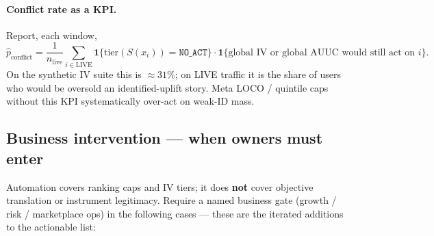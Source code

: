 \documentclass{article}
\begin{document}
\paragraph{Conflict rate as a KPI.}
Report, each window,
\[
  \widehat{p}_{\mathrm{conflict}}
  =
  \frac{1}{n_{\mathrm{live}}}
  \sum_{i\in\mathrm{LIVE}}
  \mathbf{1}\{\mathrm{tier}(S(x_i))=\texttt{NO\_ACT}\}
  \cdot
  \mathbf{1}\{\text{global IV or global AUUC would still act on }i\}.
\]
On the synthetic IV suite this is $\approx 31\%$; on LIVE traffic it is the
share of users who would be oversold an identified-uplift story.
Meta LOCO / quintile caps without this KPI systematically over-act on
weak-ID mass.

\subsection{Business intervention --- when owners must enter}
\label{sec:business-gate}

Automation covers ranking caps and IV tiers; it does \textbf{not} cover
objective translation or instrument legitimacy.
Require a named business gate (growth / risk / marketplace ops) in the
following cases --- these are the iterated additions to the actionable
list:
\end{document}
